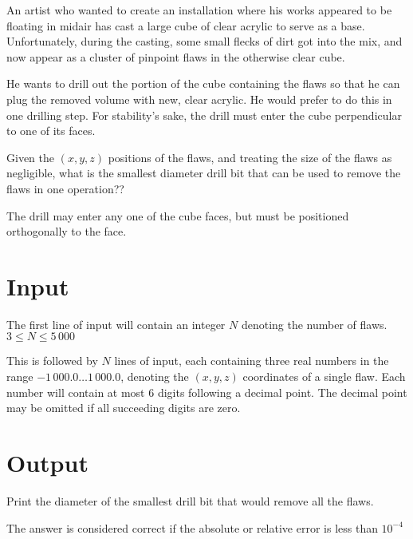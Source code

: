 

An artist who wanted to create an installation where his works
appeared to be floating in midair has cast a large cube of clear
acrylic to serve as a base. Unfortunately, during the casting, some
small flecks of dirt got into the mix, and now appear as a cluster of
pinpoint flaws in the otherwise clear cube.

He wants to drill out the portion of the cube containing the flaws so
that he can plug the removed volume with new, clear acrylic. He would
prefer to do this in one drilling step. For stability's sake, the drill must
enter the cube perpendicular to one of its faces.

Given the $(x,y,z)$ positions of the flaws, and treating the size of the
flaws as negligible, what is the smallest diameter drill bit that can
be used to remove the flaws in one operation??

The drill may enter any one of the cube faces, but must be positioned
orthogonally to the face. 

\section*{Input}

The first line of input will contain an integer $N$ denoting the
number of flaws. $3 \leq N \leq 5\,000$

This is followed by $N$ lines of input, each containing three real
numbers in the range $-1\,000.0\ldots 1\,000.0$, denoting the
$(x,y,z)$ coordinates of a single flaw. Each number will contain at
most $6$ digits following a decimal point. The decimal point may be
omitted if all succeeding digits are zero.

\section*{Output}

Print the diameter of the smallest drill bit that would remove all the flaws.

The answer is considered correct if the absolute or relative error is
less than $10^{-4}$
